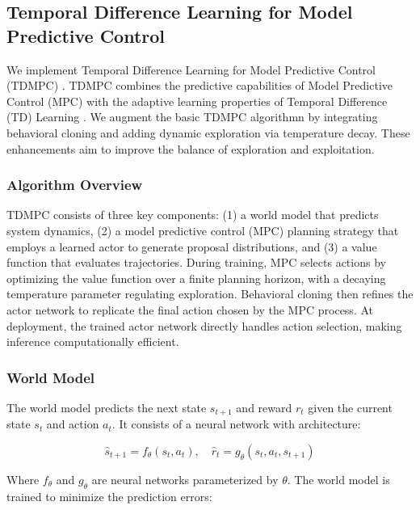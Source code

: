 \subsection{Temporal Difference Learning for Model Predictive Control}

We implement Temporal Difference Learning for Model Predictive Control (TDMPC) \cite{tdmpc}. TDMPC combines the predictive capabilities of Model Predictive Control (MPC) \cite{mpc} with the adaptive learning properties of Temporal Difference (TD) Learning \cite{td_sutton}. We augment the basic TDMPC algorithmn by integrating behavioral cloning \cite{Torabi2018BehavioralCF} and adding dynamic exploration via temperature decay. These enhancements aim to improve the balance of exploration and exploitation.

\subsubsection{Algorithm Overview}

TDMPC consists of three key components: (1) a world model that predicts system dynamics, (2) a model predictive control (MPC) planning strategy that employs a learned actor to generate proposal distributions, and (3) a value function that evaluates trajectories. During training, MPC selects actions by optimizing the value function over a finite planning horizon, with a decaying temperature parameter regulating exploration. Behavioral cloning then refines the actor network to replicate the final action chosen by the MPC process. At deployment, the trained actor network directly handles action selection, making inference computationally efficient.

\subsubsection{World Model}

The world model predicts the next state $s_{t+1}$ and reward $r_t$ given the current state $s_t$ and action $a_t$. It consists of a neural network with architecture:

\begin{equation}
\hat{s}_{t+1} = f_\theta(s_t, a_t), \quad \hat{r}_t = g_\theta(s_t, a_t, s_{t+1})
\end{equation}

Where $f_\theta$ and $g_\theta$ are neural networks parameterized by $\theta$. The world model is trained to minimize the prediction errors:

